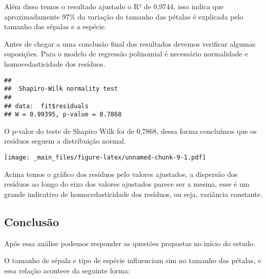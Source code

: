 \documentclass[
]{book}
\newenvironment{Shaded}{\begin{snugshade}}{\end{snugshade}}
\newcommand{\CommentTok}[1]{\textcolor[rgb]{0.56,0.35,0.01}{\textit{#1}}}
\newcommand{\FunctionTok}[1]{\textcolor[rgb]{0.00,0.00,0.00}{#1}}
\newcommand{\NormalTok}[1]{#1}
\newcommand{\SpecialCharTok}[1]{\textcolor[rgb]{0.00,0.00,0.00}{#1}}
\begin{document}
Além disso temos o resultado ajustado o R² de 0,9744, isso indica que aproximadamente 97\% da variação do tamanho das pétalas é explicada pelo tamanho das sépalas e a espécie.

Antes de chegar a uma conclusão final dos resultados devemos verificar algumas suposições. Para o modelo de regressão polinomial é necessário normalidade e homocedasticidade dos resíduos.

\begin{Shaded}
\end{Shaded}

\begin{verbatim}
## 
##  Shapiro-Wilk normality test
## 
## data:  fit$residuals
## W = 0.99395, p-value = 0.7868
\end{verbatim}

O p-valor do teste de Shapiro Wilk foi de 0,7868, dessa forma concluímos que os resíduos seguem a distribuição normal.

\begin{Shaded}
\end{Shaded}

\texttt{[image: \_main\_files/figure-latex/unnamed-chunk-9-1.pdf]}

Acima temos o gráfico dos resíduos pelo valores ajustados, a dispersão dos resíduos ao longo do eixo dos valores ajustados parece ser a mesma, esse é um grande indicativo de homocedasticidade dos resíduos, ou seja, variância constante.

\hypertarget{conclusuxe3o}{%
\subsection{Conclusão}\label{conclusuxe3o}}

Após essa análise podemos responder as questões propostas no início do estudo.

O tamanho de sépala e tipo de espécie influenciam sim no tamanho das pétalas, e essa relação acontece da seguinte forma:
\end{document}
